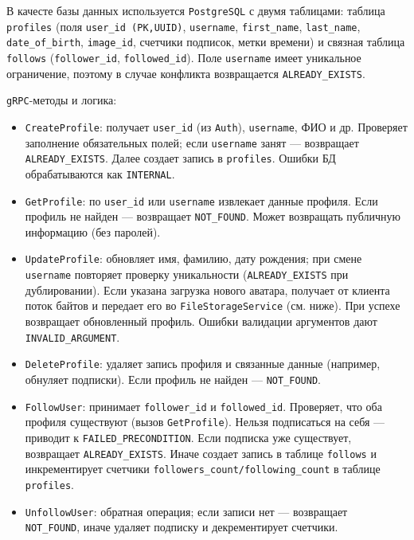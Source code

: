 В качесте базы данных используется \texttt{PostgreSQL} с двумя таблицами: таблица \texttt{profiles} (поля \texttt{user\_id (PK,UUID)}, \texttt{username}, \texttt{first\_name}, \texttt{last\_name}, \\ \texttt{date\_of\_birth}, \texttt{image\_id}, счетчики подписок, метки времени) и связная таблица \texttt{follows} (\texttt{follower\_id}, \texttt{followed\_id}). Поле \texttt{username} имеет уникальное ограничение, поэтому в случае конфликта возвращается \texttt{ALREADY\_EXISTS}.

\texttt{gRPC}-методы и логика:
\begin{itemize}
    \item \texttt{CreateProfile}: получает \texttt{user\_id} (из \texttt{Auth}), \texttt{username}, ФИО и др. Проверяет заполнение обязательных полей; если \texttt{username} занят — возвращает \texttt{ALREADY\_EXISTS}. Далее создает запись в \texttt{profiles}. Ошибки БД обрабатываются как \texttt{INTERNAL}.
    \item \texttt{GetProfile}: по \texttt{user\_id} или \texttt{username} извлекает данные профиля. Если профиль не найден — возвращает \texttt{NOT\_FOUND}. Может возвращать публичную информацию (без паролей).
    \item \texttt{UpdateProfile}: обновляет имя, фамилию, дату рождения; при смене \\ \texttt{username} повторяет проверку уникальности (\texttt{ALREADY\_EXISTS} при дублировании). Если указана загрузка нового аватара, получает от клиента поток байтов и передает его во \texttt{FileStorageService} (см. ниже). При успехе возвращает обновленный профиль. Ошибки валидации аргументов дают \texttt{INVALID\_ARGUMENT}.
    \item \texttt{DeleteProfile}: удаляет запись профиля и связанные данные (например, обнуляет подписки). Если профиль не найден — \texttt{NOT\_FOUND}.
    \item \texttt{FollowUser}: принимает \texttt{follower\_id} и \texttt{followed\_id}. Проверяет, что оба профиля существуют (вызов \texttt{GetProfile}). Нельзя подписаться на себя — приводит к \texttt{FAILED\_PRECONDITION}. Если подписка уже существует, возвращает \texttt{ALREADY\_EXISTS}. Иначе создает запись в таблице \texttt{follows} и инкрементирует счетчики \texttt{followers\_count/following\_count} в таблице \texttt{profiles}.
    \item \texttt{UnfollowUser}: обратная операция; если записи нет — возвращает\\ \texttt{NOT\_FOUND}, иначе удаляет подписку и декрементирует счетчики.

\end{itemize}
